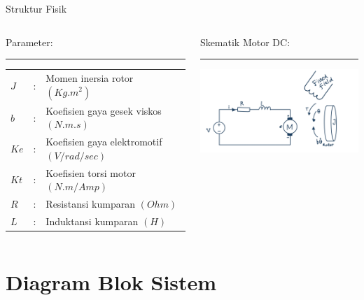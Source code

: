 \documentclass [xcolor={dvipsnames}, t] {beamer}
\begin{document}
	\begin{frame}{Struktur Fisik}
	\begin{columns}[T] %
		\begin{column}{0.48\textwidth}
			Parameter:
			\color{black}\rule{\linewidth}{4pt}
			\begin{flushleft}
				\begin{tabular}{lll}
					$J$ &:& Momen inersia rotor $(Kg.m^2)$\\
					$b$ &:& Koefisien gaya gesek viskos $(N.m.s)$\\
					$Ke$ &:& Koefisien gaya elektromotif $(V/rad/sec)$\\
					$Kt$ &:& Koefisien torsi motor $(N.m/Amp)$\\
					$R$ &:& Resistansi kumparan $(Ohm)$\\
					$L$ &:& Induktansi kumparan $(H)$\\
				\end{tabular}
			\end{flushleft}
		\end{column}%
		\hfill%
		\begin{column}{0.48\textwidth}
			Skematik Motor DC:\newline
			\color{myNewColorA}\rule{\linewidth}{4pt}
			\includegraphics[width=7.5cm]{fig/skematik motor dc.png}
		\end{column}
	\end{columns}
\end{frame}


\section{Diagram Blok Sistem}
\end{document}
